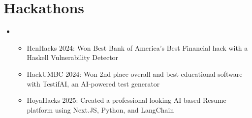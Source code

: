 \documentclass[letterpaper,11pt]{article}
\newcommand{\resumeItem}[1]{
  \item\small{
    {#1 \vspace{-2pt}}
  }
}
\newcommand{\styledSection}[1]{
  \section{\textnormal{\textbf{#1}}}
}
\newcommand{\resumeBasicListStart}{\begin{itemize}[leftmargin=0in, label={}]\item\begin{itemize}[leftmargin=0.3in]}
\newcommand{\resumeBasicListEnd}{\end{itemize}\end{itemize}}
\begin{document}
\styledSection{\textbf{Hackathons}}
    \resumeBasicListStart
        \resumeItem{HenHacks 2024: Won Best Bank of America's Best Financial hack with a Haskell Vulnerability Detector}
        \resumeItem{HackUMBC 2024: Won 2nd place overall and best educational software with TestifAI, an AI-powered test generator}
        \resumeItem{HoyaHacks 2025: Created a professional looking AI based Resume platform using Next.JS, Python, and LangChain}
    \resumeBasicListEnd
\end{document}
